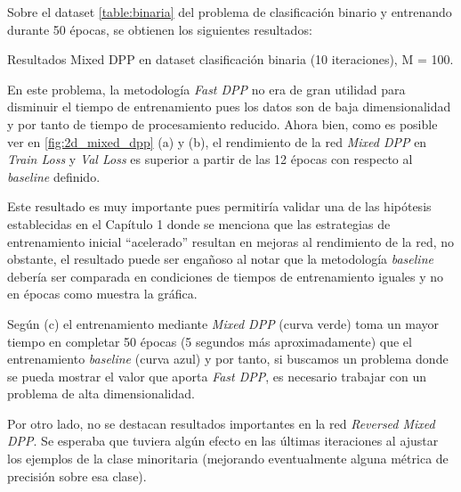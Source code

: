 \vspace{0.2cm}

Sobre el dataset \ref{table:binaria} del problema de clasificación binario y entrenando durante 50 épocas, se obtienen los siguientes resultados: 

\begin{images}[\label{fig:2d_mixed_dpp}]{\centering Resultados Mixed DPP en dataset clasificación binaria (10 iteraciones), M = 100.}

\end{images}

En este problema, la metodología \textit{Fast DPP} no era de gran utilidad para disminuir el tiempo de entrenamiento pues los datos son de baja dimensionalidad y por tanto de tiempo de procesamiento reducido. Ahora bien, como es posible ver en \ref{fig:2d_mixed_dpp} (a) y (b), el rendimiento de la red \textit{Mixed DPP} en \textit{Train Loss} y \textit{Val Loss} es superior a partir de las 12 épocas con respecto al \textit{baseline} definido. 

\vspace{0.2cm}

Este resultado es muy importante pues permitiría validar una de las hipótesis establecidas en el Capítulo 1 donde se menciona que las estrategias de entrenamiento inicial ``acelerado'' resultan en mejoras al rendimiento de la red, no obstante, el resultado puede ser engañoso al notar que la metodología \textit{baseline} debería ser comparada en condiciones de tiempos de entrenamiento iguales y no en épocas como muestra la gráfica. 

\vspace{0.2cm}

Según (c) el entrenamiento mediante \textit{Mixed DPP} (curva verde) toma un mayor tiempo en completar 50 épocas (5 segundos más aproximadamente) que el entrenamiento \textit{baseline} (curva azul) y por tanto, si buscamos un problema donde se pueda mostrar el valor que aporta \textit{Fast DPP}, es necesario trabajar con un problema de alta dimensionalidad. 

\vspace{0.2cm}

Por otro lado, no se destacan resultados importantes en la red \textit{Reversed Mixed DPP}. Se esperaba que tuviera algún efecto en las últimas iteraciones al ajustar los ejemplos de la clase minoritaria (mejorando eventualmente alguna métrica de precisión sobre esa clase). 

